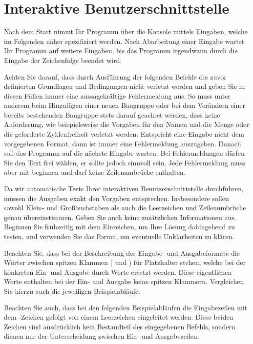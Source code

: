 \documentclass{sdqassignment}
\begin{document}
\section{Interaktive Benutzerschnittstelle}
Nach dem Start nimmt Ihr Programm über die Konsole mittels  Eingaben, welche im Folgenden näher spezifiziert werden. Nach Abarbeitung einer Eingabe wartet Ihr Programm auf weitere Eingaben, bis das Programm irgendwann durch die Eingabe der Zeichenfolge  beendet wird.

Achten Sie darauf, dass durch Ausführung der folgenden Befehle die zuvor definierten Grundlagen und Bedingungen nicht verletzt werden und geben Sie in diesen Fällen immer eine aussagekräftige Fehlermeldung aus.
So muss unter anderem beim Hinzufügen einer neuen Baugruppe oder bei dem Verändern einer bereits bestehenden Baugruppe stets darauf geachtet werden, dass keine Anforderung, wie beispielsweise die Vorgaben für den Namen und die Menge oder die geforderte Zyklenfreiheit verletzt werden.
Entspricht eine Eingabe nicht dem vorgegebenen Format, dann ist immer eine Fehlermeldung auszugeben.
Danach soll das Programm auf die nächste Eingabe warten.
Bei Fehlermeldungen dürfen Sie den Text frei wählen, er sollte jedoch sinnvoll sein.
Jede Fehlermeldung muss aber mit  beginnen und darf keine Zeilenumbrüche enthalten.

Da wir automatische Tests Ihrer interaktiven Benutzerschnittstelle durchführen, müssen die Ausgaben exakt den Vorgaben entsprechen.
Insbesondere sollen sowohl Klein- und Großbuchstaben als auch die Leerzeichen und Zeilenumbrüche genau übereinstimmen.
Geben Sie auch keine zusätzlichen Informationen aus.
Beginnen Sie frühzeitig mit dem Einreichen, um Ihre Lösung dahingehend zu testen, und verwenden Sie das Forum, um eventuelle Unklarheiten zu klären.

Beachten Sie, dass bei der Beschreibung der Eingabe- und Ausgabeformate die Wörter zwischen spitzen Klammen (\lstinlinetxt{<} und \lstinlinetxt{>}) für Platzhalter stehen, welche bei der konkreten Ein- und Ausgabe durch Werte ersetzt werden.
Diese eigentlichen Werte enthalten bei der Ein- und Ausgabe keine spitzen Klammern.
Vergleichen Sie hierzu auch die jeweiligen Beispielabläufe.

Beachten Sie auch, dass bei den folgenden Beispielabläufen die Eingabezeilen mit dem \lstinlinetxt{>}-Zeichen gefolgt von einem Leerzeichen eingeleitet werden.
Diese beiden Zeichen sind ausdrücklich kein Bestandteil des eingegebenen Befehls, sondern dienen nur der Unterscheidung zwischen Ein- und Ausgabezeilen.
\end{document}
